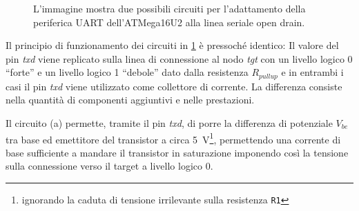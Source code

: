 \begin{figure}[t]
    \centering

    \caption[]{L'immagine mostra due possibili circuiti per l'adattamento della periferica UART dell'ATMega16U2 alla linea seriale open drain.}\label{fig:od-impl}
\end{figure}

Il principio di funzionamento dei circuiti in \cref{fig:od-impl} è pressoché identico: Il valore del pin \textit{txd} viene replicato sulla linea di connessione al nodo \textit{tgt} con un livello logico 0 ``forte'' e un livello logico 1 ``debole'' dato dalla resistenza \(R_{pullup}\) e in entrambi i casi il pin \textit{txd} viene utilizzato come collettore di corrente.
La differenza consiste nella quantità di componenti aggiuntivi e nelle prestazioni.

Il circuito (a) permette, tramite il pin \textit{txd}, di porre la differenza di potenziale \(V_{be}\) tra base ed emettitore del transistor a circa \SI{5}{\volt}\footnote{ignorando la caduta di tensione irrilevante sulla resistenza \texttt{R1}}, permettendo una corrente di base sufficiente a mandare il transistor in saturazione imponendo così la tensione sulla connessione verso il target a livello logico 0.


